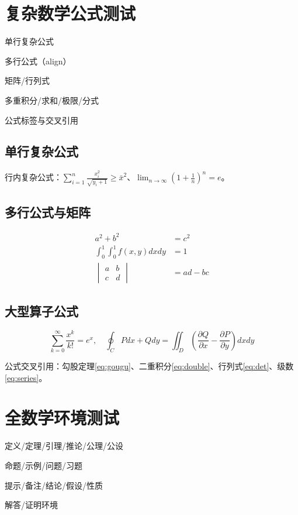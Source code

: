 \chapter{复杂数学公式测试}
\begin{introduction}
\item 单行复杂公式
\item 多行公式（align）
\item 矩阵/行列式
\item 多重积分/求和/极限/分式
\item 公式标签与交叉引用
\end{introduction}

\section{单行复杂公式}
行内复杂公式：$\sum_{i=1}^n \frac{x_i^2}{\sqrt{y_i+1}} \geq \bar{x}^2$、$\lim_{n\to\infty} \left(1+\frac{1}{n}\right)^n = e$。

\section{多行公式与矩阵}
\begin{align}
a^2 + b^2 &= c^2 \label{eq:gougu} \\
\int_{0}^{1}\int_{0}^{1} f(x,y) dxdy &= 1 \label{eq:double} \\
\begin{vmatrix}
a & b \\
c & d
\end{vmatrix} &= ad-bc \label{eq:det}
\end{align}

\section{大型算子公式}
\begin{equation}\label{eq:series}
\sum_{k=0}^{\infty} \frac{x^k}{k!} = e^x,\quad \oint_{C} Pdx+Qdy = \iint_{D}\left(\frac{\partial Q}{\partial x}-\frac{\partial P}{\partial y}\right)dxdy
\end{equation}

公式交叉引用：勾股定理\eqref{eq:gougu}、二重积分\eqref{eq:double}、行列式\eqref{eq:det}、级数\eqref{eq:series}。

\chapter{全数学环境测试}
\begin{introduction}
\item 定义/定理/引理/推论/公理/公设
\item 命题/示例/问题/习题
\item 提示/备注/结论/假设/性质
\item 解答/证明环境
\end{introduction}

